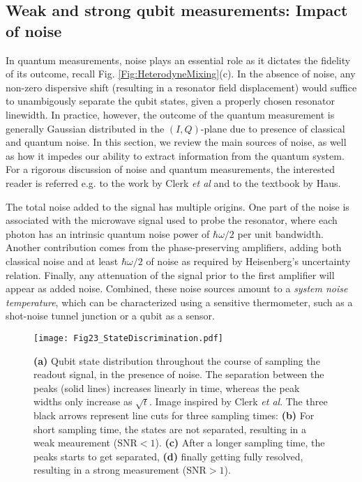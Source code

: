 \documentclass[aip,apr,twocolumn,showpacs,superscriptaddress,groupedaddress,nofootinbib,reprint]{revtex4-1}  %
\begin{document}
\subsection{Weak and strong qubit measurements: Impact of noise}

In quantum measurements, noise plays an essential role as it dictates the fidelity of its outcome\cite{Caves1982,Clerk2010}, recall Fig. \ref{Fig:HeterodyneMixing}(c). In the absence of noise, any non-zero dispersive shift (resulting in a resonator field displacement) would suffice to unambigously separate the qubit states, given a properly chosen resonator linewidth. In practice, however, the outcome of the quantum measurement is generally Gaussian distributed in the $(I,Q)$-plane due to presence of classical and quantum noise. In this section, we review the main sources of noise, as well as how it impedes our ability to extract information from the quantum system. For a rigorous discussion of noise and quantum measurements, the interested reader is referred e.g. to the work by Clerk \textit{et al}\cite{Clerk2010} and to the textbook by Haus\cite{Haus2000}.

The total noise added to the signal has multiple origins. One part of the noise is associated with the microwave signal used to probe the resonator, where each photon has an intrinsic quantum noise power of $\hbar\omega/2$ per unit bandwidth. Another contribution comes from the phase-preserving amplifiers, adding both classical noise and at least $\hbar\omega/2$ of noise as required by Heisenberg's uncertainty relation. Finally, any attenuation of the signal prior to the first amplifier will appear as added noise. Combined, these noise sources amount to a \textit{system noise temperature}, which can be characterized using a sensitive thermometer, such as a shot-noise tunnel junction\cite{Simoen2015} or a qubit\cite{Macklin2015} as a sensor.

\begin{figure}[t!]
\begin{center}
\texttt{[image: Fig23\_StateDiscrimination.pdf]}
\caption{\textbf{(a)} Qubit state distribution throughout the course of sampling the readout signal, in the presence of noise. The separation between the peaks (solid lines) increases linearly in time, whereas the peak widths only increase as $\sqrt{t}$. Image inspired by Clerk \textit{et al}\cite{Clerk2010}. The three black arrows represent line cuts for three sampling times: \textbf{(b)} For short sampling time, the states are not separated, resulting in a weak meaurement ($\mbox{SNR} < 1$). \textbf{(c)} After a longer sampling time, the peaks starts to get separated, \textbf{(d)} finally getting fully resolved, resulting in a strong measurement ($\mbox{SNR} > 1$).}
\label{Fig:Noise}
\end{center}
\end{figure}
\end{document}
